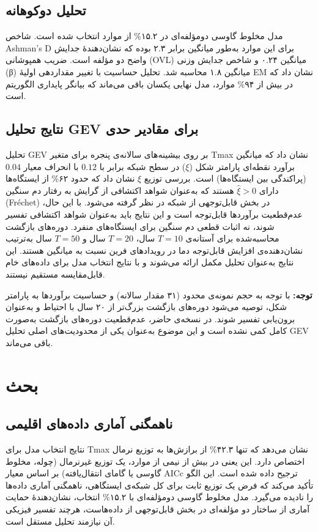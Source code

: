 \documentclass[12pt,a4paper,twocolumn]{article}
\begin{document}
\subsection{تحلیل دوکوهانه}
مدل مخلوط گاوسی دومؤلفه‌ای در ۱۵.۲\% از موارد انتخاب شده است. شاخص Ashman's D برای این موارد به‌طور میانگین برابر ۲.۳ بوده که نشان‌دهندهٔ جدایش واضح دو مؤلفه است. ضریب همپوشانی (OVL) میانگین ۰.۲۴ و شاخص جدایش وزنی (β) میانگین ۱.۸ محاسبه شد. تحلیل حساسیت با تغییر مقداردهی اولیهٔ EM نشان داد که در بیش از ۹۴\% موارد، مدل نهایی یکسان باقی می‌ماند که بیانگر پایداری الگوریتم است.

\subsection{نتایج تحلیل GEV برای مقادیر حدی}
تحلیل GEV بر روی بیشینه‌های سالانه‌ی پنجره برای متغیر Tmax نشان داد که میانگین برآورد نقطه‌ای پارامتر شکل ($\xi$) در سطح شبکه برابر با $0.12$ با انحراف معیار $0.04$ (پراکندگی بین ایستگاه‌ها) است. بررسی توزیع $\xi$ نشان داد که حدود ۶۲\% از ایستگاه‌ها دارای $\hat\xi>0$ هستند که به‌عنوان شواهد اکتشافی از گرایش به رفتار دم سنگین (Fréchet) در بخش قابل‌توجهی از شبکه در نظر گرفته می‌شود. با این حال، عدم‌قطعیت برآوردها قابل‌توجه است و این نتایج باید به‌عنوان شواهد اکتشافی تفسیر شوند، نه اثبات قطعی دم سنگین برای ایستگاه‌های منفرد. دوره‌های بازگشت محاسبه‌شده برای آستانه‌ی $T=10$ سال، $T=20$ سال و $T=50$ سال به‌ترتیب نشان‌دهنده‌ی افزایش قابل‌توجه دما در رویدادهای فرین نسبت به میانگین هستند. این نتایج به‌عنوان تحلیل مکمل ارائه می‌شوند و با نتایج انتخاب مدل برای داده‌های خام قابل‌مقایسه مستقیم نیستند.

\textbf{توجه:} با توجه به حجم نمونه‌ی محدود (۳۱ مقدار سالانه) و حساسیت برآوردها به پارامتر شکل، توصیه می‌شود دوره‌های بازگشت بزرگ‌تر از ۲۰ سال با احتیاط و به‌عنوان برون‌یابی تفسیر شوند. در نسخه‌ی حاضر، عدم‌قطعیت دوره‌های بازگشت به‌صورت کامل کمی نشده است و این موضوع به‌عنوان یکی از محدودیت‌های اصلی تحلیل GEV باقی می‌ماند.

\section{بحث}

\subsection{ناهمگنی آماری داده‌های اقلیمی}
نتایج انتخاب مدل برای Tmax نشان می‌دهد که تنها ۴۲.۳\% از برازش‌ها به توزیع نرمال اختصاص دارد. این یعنی در بیش از نیمی از موارد، یک توزیع غیرنرمال (چوله، مخلوط گاوسی یا گامای انتقال‌یافته) بر اساس معیار AICc ترجیح داده شده است. این الگو تأکید می‌کند که فرض یک توزیع ثابت برای کل شبکه‌ی ایستگاهی، ناهمگنی آماری داده‌ها را نادیده می‌گیرد. مدل مخلوط گاوسی دومؤلفه‌ای با ۱۵.۲\% انتخاب، نشان‌دهندهٔ حمایت آماری از ساختار دو مؤلفه‌ای در بخش قابل‌توجهی از داده‌هاست، هرچند تفسیر فیزیکی آن نیازمند تحلیل مستقل است.
\end{document}
